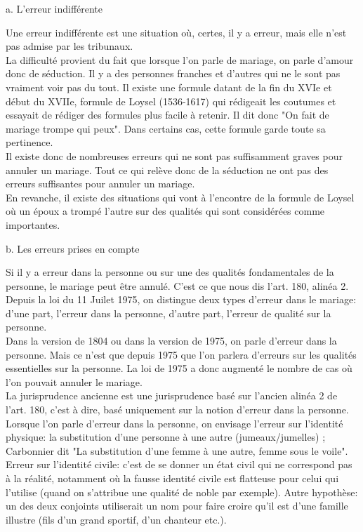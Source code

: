 \documentclass[12pt, a4paper, openany]{book}
\begin{document}
a. L'erreur indifférente


Une erreur indifférente est une situation où, certes, il y a erreur, mais elle n'est pas admise par les tribunaux. \\
La difficulté provient du fait que lorsque l'on parle de mariage, on parle d'amour donc de séduction. Il y a des personnes franches et d'autres qui ne le sont pas vraiment voir pas du tout. Il existe une formule datant de la fin du XVIe et début du XVIIe, formule de Loysel (1536-1617) qui rédigeait les coutumes et essayait de rédiger des formules plus facile à retenir. Il dit donc "On fait de mariage trompe qui peux". Dans certains cas, cette formule garde toute sa pertinence. \\
Il existe donc de nombreuses erreurs qui ne sont pas suffisamment graves pour annuler un mariage. Tout ce qui relève donc de la séduction ne ont pas des erreurs suffisantes pour annuler un mariage. \\
En revanche, il existe des situations qui vont à l'encontre de la formule de Loysel où un époux a trompé l'autre sur des qualités qui sont considérées comme importantes. 


b. Les erreurs prises en compte


Si il y a erreur dans la personne ou sur une des qualités fondamentales de la personne, le mariage peut être annulé. C'est ce que nous dis l'art. 180, alinéa 2. \\
Depuis la loi du 11 Juilet 1975, on distingue deux types d'erreur dans le mariage: d'une part, l'erreur dans la personne, d'autre part, l'erreur de qualité sur la personne. \\
Dans la version de 1804 ou dans la version de 1975, on parle d'erreur dans la personne. Mais ce n'est que depuis 1975 que l'on parlera d'erreurs sur les qualités essentielles sur la personne. La loi de 1975 a donc augmenté le nombre de cas où l'on pouvait annuler le mariage. \\
La jurisprudence ancienne est une jurisprudence basé sur l'ancien alinéa 2 de l'art. 180, c'est à dire, basé uniquement sur la notion d'erreur dans la personne. Lorsque l'on parle d'erreur dans la personne, on envisage l'erreur sur l'identité physique: la substitution d'une personne à une autre (jumeaux/jumelles) ; Carbonnier dit "La substitution d'une femme à une autre, femme sous le voile". \\
Erreur sur l'identité civile: c'est de se donner un état civil qui ne correspond pas à la réalité, notamment où la fausse identité civile est flatteuse pour celui qui l'utilise (quand on s'attribue une qualité de noble par exemple). Autre hypothèse: un des deux conjoints utiliserait un nom pour faire croire qu'il est d'une famille illustre (fils d'un grand sportif, d'un chanteur etc.).
\end{document}
